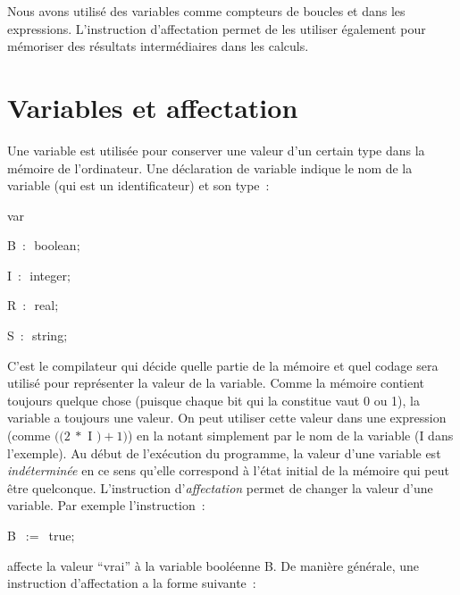 Nous avons utilisé des variables comme compteurs de boucles et dans les expressions. 
L'instruction d'affectation
permet de les utiliser également pour mémoriser des résultats intermédiaires dans les
calculs.

\section{Variables et affectation}
Une variable est utilisée pour conserver une valeur d'un certain type dans la mémoire
de l'ordinateur. Une déclaration de variable indique le nom de la variable (qui est un identificateur)
et son type~:

\vspace{\neglskip}\mbox{\blc  \blk\idt  \mcl var\idt }\par 
\vspace{\neglskip}\mbox{\blc  \blk\blk\idt  B\ $:$\ boolean$;$}\par 
\vspace{\neglskip}\mbox{\blc  \blk\blk\idt  I\ $:$\ integer$;$}\par 
\vspace{\neglskip}\mbox{\blc  \blk\blk\idt  R\ $:$\ real$;$}\par 
\vspace{\neglskip}\mbox{\blc  \blk\blk\idt  S\ $:$\ string$;$}\par

\noindent C'est le compilateur qui décide quelle partie de la mémoire et quel codage sera utilisé pour
représenter la valeur de la variable. Comme la mémoire contient toujours quelque chose (puisque
chaque bit qui la constitue vaut 0 ou 1), la
variable a toujours une valeur. On peut utiliser cette valeur dans une expression (comme
$((2\:\ast$ {\idt I} $) + 1)$) en la notant
simplement par le nom de la variable ({\idt I} dans l'exemple). Au début de l'exécution du programme, la valeur
d'une variable est {\em indéterminée} en ce sens qu'elle correspond à l'état initial de la 
mémoire qui peut être quelconque.  L'instruction d'{\em affectation\/} permet de changer la 
valeur d'une variable. Par exemple l'instruction~:

\vspace{\neglskip}\mbox{\blc  \blk\blk\idt  B\ $:=$\ true$;$}\par 

\noindent affecte la valeur ``vrai'' à la variable booléenne {\idt B}. De manière générale, une
instruction d'affectation a la forme suivante~:

